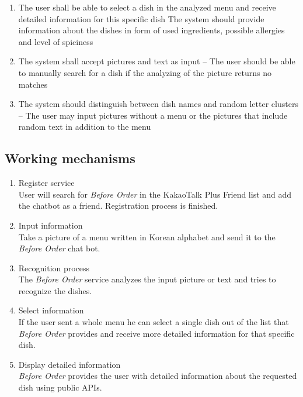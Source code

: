 \begin{enumerate}[label=A.\arabic*]
\item The user shall be able to select a dish in the analyzed menu and receive detailed information for this specific dish
The system should provide information about the dishes in form of used ingredients, possible allergies and level of spiciness
\item The system shall accept pictures and text as input – The user should be able to manually search for a dish if the analyzing of the picture returns no matches
\item The system should distinguish between dish names and random letter clusters – The user may input pictures without a menu or the pictures that include random text in addition to the menu
\end{enumerate}

\subsection{Working mechanisms}
\begin{enumerate}
\item Register service\\
User will search for \emph{Before Order} in the KakaoTalk Plus Friend list and add the chatbot as a friend. Registration process is finished.
\item Input information\\
Take a picture of a menu written in Korean alphabet and send it to the \emph{Before Order} chat bot.
\item Recognition process\\
The \emph{Before Order} service analyzes the input picture or text and tries to recognize the dishes.
\item Select information\\
If the user sent a whole menu he can select a single dish out of the list that \emph{Before Order} provides and receive more detailed information for that specific dish.
\item Display detailed information\\\emph{Before Order} provides the user with detailed information about the requested dish using public APIs.
\end{enumerate}